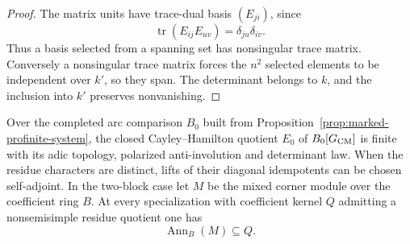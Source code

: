 \begin{proof}
The matrix units have trace-dual basis \((E_{ji})\), since
\[
 \operatorname{tr}(E_{ij}E_{uv})=\delta_{ju}\delta_{iv}.
\]
Thus a basis selected from a spanning set has nonsingular trace matrix. Conversely a nonsingular trace matrix forces the \(n^2\) selected elements to be independent over \(k'\), so they span. The determinant belongs to \(k\), and the inclusion into \(k'\) preserves nonvanishing.
\end{proof}

\begin{proposition}
\label{prop:marked-finite-ch-algebra}
Over the completed arc comparison \(B_0\) built from
Proposition~\ref{prop:marked-profinite-system}, the closed
Cayley--Hamilton quotient \(E_0\) of \(B_0[G_{\rm CM}]\) is finite
with its adic topology, polarized anti-involution and determinant law. When the residue characters are distinct, lifts of their diagonal
idempotents can be chosen self-adjoint. In the two-block case let
\(M\) be the mixed corner module over the coefficient ring \(B\).
At every specialization with coefficient kernel \(Q\) admitting a nonsemisimple residue quotient one has
\[
          \operatorname{Ann}_B(M)\subseteq Q .
\]
\end{proposition}

